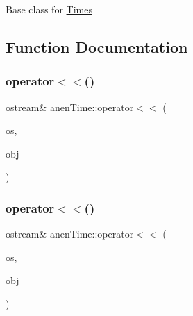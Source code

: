 Base class for \mbox{\hyperlink{classanen_time_1_1_times}{Times}} 

\subsection{Function Documentation}
\mbox{\label{namespaceanen_time_ab90a5dd8a6a0a1bd15220276fe8043b7}} 
\subsubsection{\texorpdfstring{operator$<$$<$()}{operator<<()}\hspace{0.1cm}{\footnotesize\ttfamily [1/2]}}
{\footnotesize\ttfamily ostream\& anen\+Time\+::operator$<$$<$ (\begin{DoxyParamCaption}\item[{ostream \&}]{os,  }\item[{\mbox{\hyperlink{classanen_time_1_1_times}{Times}} const \&}]{obj }\end{DoxyParamCaption})}

\mbox{\label{namespaceanen_time_a51b4045300f072275ce700d5b3362ca6}} 
\subsubsection{\texorpdfstring{operator$<$$<$()}{operator<<()}\hspace{0.1cm}{\footnotesize\ttfamily [2/2]}}
{\footnotesize\ttfamily ostream\& anen\+Time\+::operator$<$$<$ (\begin{DoxyParamCaption}\item[{ostream \&}]{os,  }\item[{\mbox{\hyperlink{classanen_time_1_1_f_l_ts}{F\+L\+Ts}} const \&}]{obj }\end{DoxyParamCaption})}

